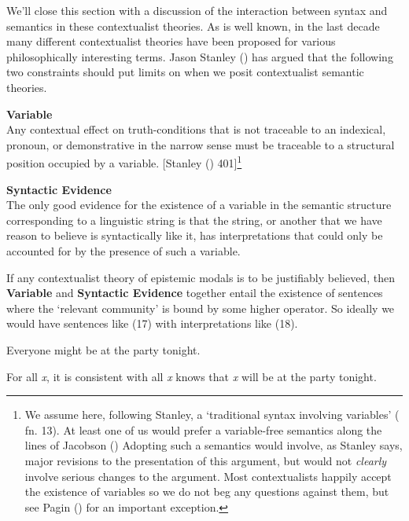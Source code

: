 \documentclass[
  11pt,
  letterpaper,
  DIV=11,
  numbers=noendperiod]{scrartcl}
\providecommand{\tightlist}{%
  \setlength{\itemsep}{0pt}\setlength{\parskip}{0pt}}\usepackage{longtable,booktabs,array}
\begin{document}
We'll close this section with a discussion of the interaction between
syntax and semantics in these contextualist theories. As is well known,
in the last decade many different contextualist theories have been
proposed for various philosophically interesting terms. Jason Stanley
() has argued that the following
two constraints should put limits on when we posit contextualist
semantic theories.

\textbf{Variable}\\
Any contextual effect on truth-conditions that is not traceable to an
indexical, pronoun, or demonstrative in the narrow sense must be
traceable to a structural position occupied by a variable. {[}Stanley
() 401{]}\footnote{We assume
  here, following Stanley, a `traditional syntax involving variables'
  ( fn. 13). At least one
  of us would prefer a variable-free semantics along the lines of
  Jacobson () Adopting such a semantics
  would involve, as Stanley says, major revisions to the presentation of
  this argument, but would not \emph{clearly} involve serious changes to
  the argument. Most contextualists happily accept the existence of
  variables so we do not beg any questions against them, but see Pagin
  () for an important exception.}

\textbf{Syntactic Evidence}\\
The only good evidence for the existence of a variable in the semantic
structure corresponding to a linguistic string is that the string, or
another that we have reason to believe is syntactically like it, has
interpretations that could only be accounted for by the presence of such
a variable.

If any contextualist theory of epistemic modals is to be justifiably
believed, then \textbf{Variable} and \textbf{Syntactic Evidence}
together entail the existence of sentences where the `relevant
community' is bound by some higher operator. So ideally we would have
sentences like (17) with interpretations like (18).

\begin{description}
\tightlist
\item[(17)]
Everyone might be at the party tonight.
\item[(18)]
For all \emph{x}, it is consistent with all \emph{x} knows that \emph{x}
will be at the party tonight.
\end{description}
\end{document}
